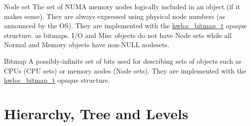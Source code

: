 \begin{DoxyDescription}
\item[Node set ]The set of N\+U\+MA memory nodes logically included in an object (if it makes sense). They are always expressed using physical node numbers (as announced by the OS). They are implemented with the \hyperlink{a00205_gaa3c2bf4c776d603dcebbb61b0c923d84}{hwloc\+\_\+bitmap\+\_\+t} opaque structure. as bitmaps. I/O and Misc objects do not have Node sets while all Normal and Memory objects have non-\/\+N\+U\+LL nodesets.


\item[Bitmap ]A possibly-\/infinite set of bits used for describing sets of objects such as C\+P\+Us (C\+PU sets) or memory nodes (Node sets). They are implemented with the \hyperlink{a00205_gaa3c2bf4c776d603dcebbb61b0c923d84}{hwloc\+\_\+bitmap\+\_\+t} opaque structure. 


\end{DoxyDescription}

 \hypertarget{a00380_termsanddefs_tree}{}\section{Hierarchy, Tree and Levels}\label{a00380_termsanddefs_tree}

